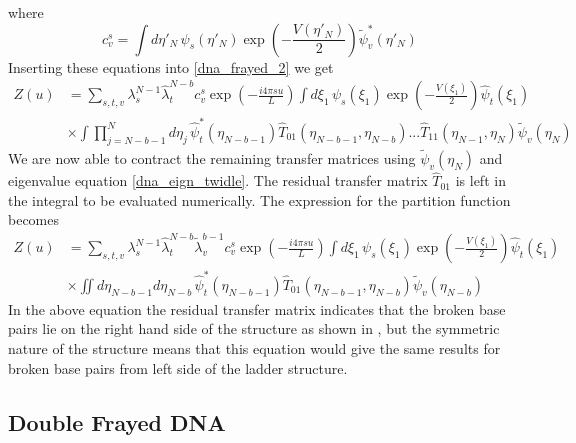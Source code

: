 %
where
%
\begin{equation}
c^{s}_{v}=\int d\eta'_{N}\,\psi_{s}\left(\eta'_{N}\right)\exp\left(-\frac{V\left(\eta'_{N}\right)}{2}\right)\tilde{\psi}^{*}_{v}\left(\eta'_{N}\right)
\end{equation}
%
Inserting these equations into \eqref{dna_frayed_2} we get 
%
\begin{align}
\label{dna_frayed_3}
Z\left(u\right)&=\sum_{s,t,v}\lambda_{s}^{N-1}\hat{\lambda}_{t}^{N-b}c^{s}_{v}\exp\left(-\frac{i4\pi s u}{L}\right)\int d\xi_{1}\,\psi_{s}\left(\xi_{1}\right)\exp\left(-\frac{V\left(\xi_{1}\right)}{2}\right)\hat{\psi}_{t}\left(\xi_{1}\right)\nonumber\\
&\times\int\prod_{j=N-b-1}^{N}d\eta_{j}\,\hat{\psi}^{*}_{t}\left(\eta_{N-b-1}\right)\hat{T}_{01}\left(\eta_{N-b-1},\eta_{N-b}\right)...\hat{T}_{11}\left(\eta_{N-1},\eta_{N}\right)\tilde{\psi}_{v}\left(\eta_{N}\right)
\end{align}
%
We are now able to contract the remaining transfer matrices using $\tilde{\psi}_{v}\left(\eta_{N}\right)$ and eigenvalue equation \eqref{dna_eign_twidle}. The residual transfer matrix $\hat{T}_{01}$ is left in the integral to be evaluated numerically. The expression for the partition function becomes
%
\begin{align}
\label{dna_frayed_4}
Z\left(u\right)&=\sum_{s,t,v}\lambda_{s}^{N-1}\hat{\lambda}_{t}^{N-b}\tilde{\lambda}_{v}^{b-1}c^{s}_{v}\exp\left(-\frac{i4\pi s u}{L}\right)\int d\xi_{1}\,\psi_{s}\left(\xi_{1}\right)\exp\left(-\frac{V\left(\xi_{1}\right)}{2}\right)\hat{\psi}_{t}\left(\xi_{1}\right)\nonumber\\
&\times\iint d\eta_{N-b-1}d\eta_{N-b}\,\hat{\psi}^{*}_{t}\left(\eta_{N-b-1}\right)\hat{T}_{01}\left(\eta_{N-b-1},\eta_{N-b}\right)\tilde{\psi}_{v}\left(\eta_{N-b}\right)
\end{align}
%
In the above equation the residual transfer matrix indicates that the broken base pairs lie on the right hand side of the structure as shown in , but the symmetric nature of the structure means that this equation would give the same results for broken base pairs from left side of the ladder structure.
%
\subsection{Double Frayed DNA}

